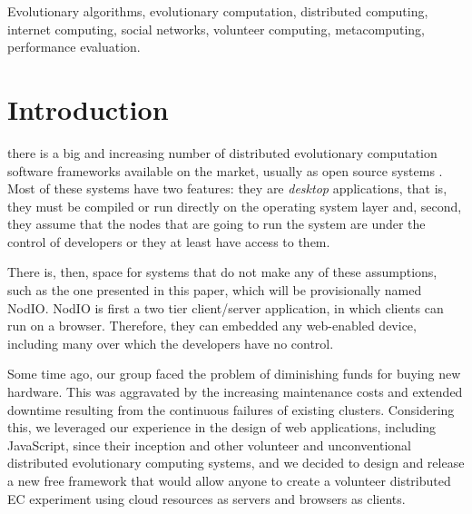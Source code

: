 \documentclass[journal,onecolumn]{IEEEtran}
\begin{document}
\begin{IEEEkeywords}
Evolutionary algorithms, evolutionary computation, distributed computing, internet computing,
social networks, volunteer computing, metacomputing, performance evaluation.
\end{IEEEkeywords}

\section{Introduction}

 there is a big and increasing number of
distributed evolutionary computation software frameworks available on
the market, usually as open source systems \cite{Parejo12Survey}. Most of these systems have 
two features: they are {\em desktop} applications, that is, they must
be compiled or run directly on the operating system layer and, second,
they assume that the nodes that are going to run the system are under
the control of developers or they at least have access to them.

There is, then, space for systems that do not make any of these
assumptions, such as the one presented in this paper, which will be
provisionally named {\sf NodIO}. {\sf NodIO} is first
 a two tier client/server 
application, in which clients can run on a browser. 
Therefore, they can
 embedded any web-enabled device, including many over which 
the developers have no control.

Some time ago, our group faced the problem of diminishing funds for
buying new hardware. This was aggravated by the increasing maintenance costs and
extended downtime resulting from the continuous failures of existing
clusters.
Considering this, we leveraged 
our experience in the design of web
applications, including JavaScript, since their inception and other
volunteer and
unconventional distributed evolutionary computing systems, and we
decided to design and release a new free framework that would allow anyone to
create a volunteer distributed EC experiment using cloud resources as
servers and browsers as clients.
\end{document}
